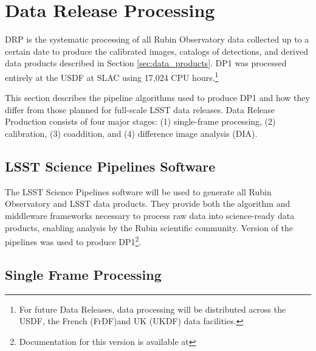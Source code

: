 \section{Data Release Processing}
\label{sec:drp}

\gls{DRP} is the systematic processing of all Rubin Observatory data collected up to a certain date to produce the calibrated images, catalogs of detections, and derived data products described in Section \ref{sec:data_products}.
\gls{DP1} was processed entirely at the \gls{USDF} at SLAC using 17,024 CPU hours.\footnote{For future Data Releases, data processing will be distributed across the USDF, the French (FrDF)and UK (UKDF) data facilities.}

This section describes the pipeline algorithms used to produce \gls{DP1} and how they differ from those planned for full-scale LSST data releases.
Data Release Production consists of four major stages: (1) single-frame processing, (2) calibration, (3) coaddition, and (4) difference image analysis (DIA).

\subsection{LSST Science Pipelines Software}
\label{ssec:pipelines}
The  LSST Science Pipelines software \citep{PSTN-019, LDM-151} will be used to generate all Rubin Observatory and LSST data products.
They provide both the \gls{algorithm} and \gls{middleware} frameworks necessary to process raw data into science-ready data products, enabling analysis by the Rubin scientific community.
Version \sciencepipelinesversion of the pipelines was used to produce \gls{DP1}\footnote{Documentation for this version is available at \sciencepipelinesurl}.

\subsection{Single Frame Processing}
\label{ssec:single_frame_processing}

